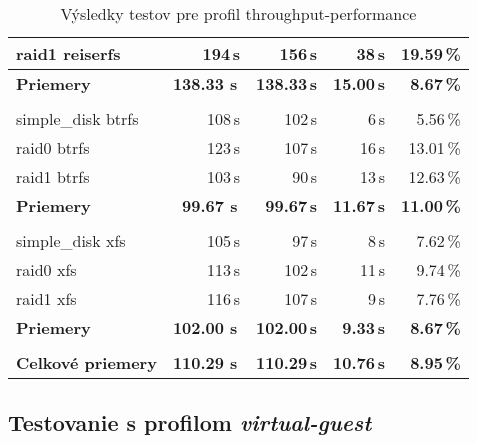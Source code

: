 \begin{table}[H]
\begin{center}
\begin{tabular}{|l|r r r r|}
    raid1 reiserfs & 194\,s & 156\,s & 38\,s & 19.59\,\% \\
    \hline
    \textbf{Priemery} & \textbf{138.33 s}\,& \textbf{138.33\,s} & \textbf{15.00\,s} & \textbf{8.67\,\%} \\
    \hline & \\[-1em]\hline
    simple\_disk btrfs & 108\,s & 102\,s & 6\,s & 5.56\,\% \\
    raid0 btrfs & 123\,s & 107\,s & 16\,s & 13.01\,\% \\
    raid1 btrfs & 103\,s & 90\,s & 13\,s & 12.63\,\% \\
    \hline
    \textbf{Priemery} & \textbf{99.67 s}\,& \textbf{99.67\,s} & \textbf{11.67\,s} & \textbf{11.00\,\%} \\
    \hline & \\[-1em]\hline
    simple\_disk xfs & 105\,s & 97\,s & 8\,s & 7.62\,\% \\
    raid0 xfs & 113\,s & 102\,s & 11\,s & 9.74\,\% \\
    raid1 xfs & 116\,s & 107\,s & 9\,s & 7.76\,\% \\
    \hline
    \textbf{Priemery} & \textbf{102.00 s}\,& \textbf{102.00\,s} & \textbf{9.33\,s} & \textbf{8.67\,\%} \\
    \hline & \\[-1em]\hline
    \textbf{Celkové priemery} & \textbf{110.29 s}\,& \textbf{110.29\,s} & \textbf{10.76\,s} & \textbf{8.95\,\%} \\
    \hline
\end{tabular}
\caption{Výsledky testov pre profil throughput-performance}
\label{tab:results-xfs}
\end{center}
\end{table}

\subsection{Testovanie s profilom \emph{virtual-guest}}

